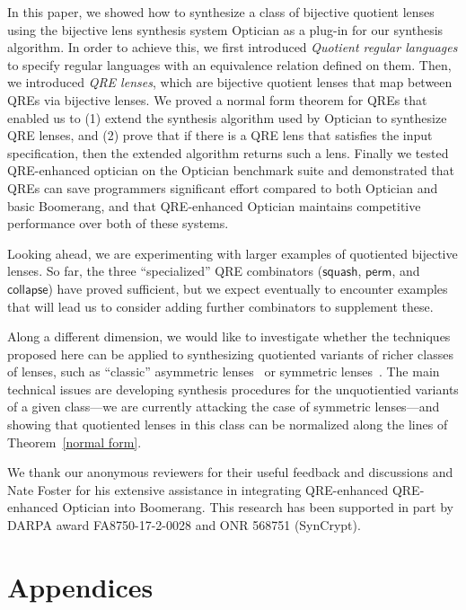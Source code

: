 \documentclass[acmsmall,screen]{acmart}
\newcommand{\kw}[1]{\textcolor{dkblue}{\ensuremath{\mathsf{#1}}}}
\newcommand{\QOpt}{QRE-enhanced Optician}
\begin{document}
In this paper, we showed how to synthesize a class of bijective quotient lenses
using the bijective lens synthesis system Optician as a plug-in for our
synthesis algorithm. In order to achieve this, we first introduced {\em
Quotient regular languages} to specify regular languages with an equivalence
relation defined on them. Then, we introduced {\em QRE lenses}, which
are bijective quotient lenses that map between QREs via bijective lenses. We
proved a normal form theorem for QREs that enabled us to (1) extend the
synthesis algorithm used by Optician to synthesize QRE lenses, and (2) prove
that if there is a QRE lens that satisfies the input specification, then the
extended algorithm returns such a lens. Finally we tested QRE-enhanced optician
on the Optician benchmark suite and demonstrated that QREs can save programmers
significant effort compared to both Optician and basic Boomerang, and that
QRE-enhanced Optician maintains competitive performance over both of these
systems.

Looking ahead, we are experimenting with larger examples of
quotiented bijective lenses.  So far, the three ``specialized'' QRE
combinators (\kw{squash}, \kw{perm}, and \kw{collapse}) have proved
sufficient, but we expect eventually to encounter examples that will lead us
to consider adding further combinators to supplement these.

Along a different dimension, we would like to investigate whether the techniques
proposed here can be applied to synthesizing quotiented variants of richer
classes of lenses, such as ``classic'' asymmetric lenses~\cite{Lenses} or
symmetric lenses~\cite{hofmann2011symmetric}.  The main technical issues are
developing synthesis procedures for the unquotientied variants of a given
class---we are currently attacking the case of symmetric lenses---and showing
that quotiented lenses in this class can be normalized along the lines of
Theorem~\ref{normal form}.

\begin{acks}
  We thank our anonymous reviewers for their useful feedback and discussions and Nate Foster for his extensive assistance in integrating
  QRE-enhanced \QOpt{} into Boomerang.  This research has been supported in part by DARPA
  award FA8750-17-2-0028 and ONR 568751 (SynCrypt).
\end{acks}

\appendix
{}
\section*{Appendices}
\end{document}
